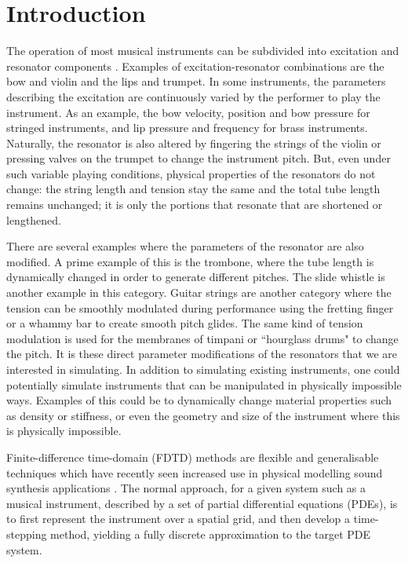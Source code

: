 \section{Introduction}
The operation of most musical instruments can be subdivided into excitation and resonator components \cite{Borin1989}. Examples of excitation-resonator combinations are the bow and violin and the lips and trumpet. In some instruments, the parameters describing the excitation are continuously varied by the performer to play the instrument. As an example, the bow velocity, position and bow pressure for stringed instruments, and lip pressure and frequency for brass instruments. Naturally, the resonator is also altered by fingering the strings of the violin or pressing valves on the trumpet to change the instrument pitch. But, even under such variable playing conditions, physical properties of the resonators do not change: the string length and tension stay the same and the total tube length remains unchanged; it is only the portions that resonate that are shortened or lengthened.

There are several examples where the parameters of the resonator are also modified. A prime example of this is the trombone, where the tube length is dynamically changed in order to generate different pitches. The slide whistle is another example in this category. Guitar strings are another category where the tension can be smoothly modulated during performance using the fretting finger or a whammy bar  %
to create smooth pitch glides. The same kind of tension modulation is used for the membranes of timpani or ``hourglass drums" to change the pitch. 
It is these direct parameter modifications of the resonators that we are interested in simulating. In addition to simulating existing instruments, one could potentially simulate instruments that can be manipulated in physically impossible ways. Examples of this could be to dynamically change material properties such as density or stiffness, or even the geometry and size of the instrument where this is physically impossible.

Finite-difference time-domain (FDTD) methods are flexible and generalisable techniques which have recently seen increased use in physical modelling sound synthesis applications \cite{bilbao2009}. The normal approach, for a given system such as a musical instrument, described by a set of partial differential equations (PDEs), is to first represent the instrument over a spatial grid, and then develop a time-stepping method, yielding a fully discrete approximation to the target PDE system. 

